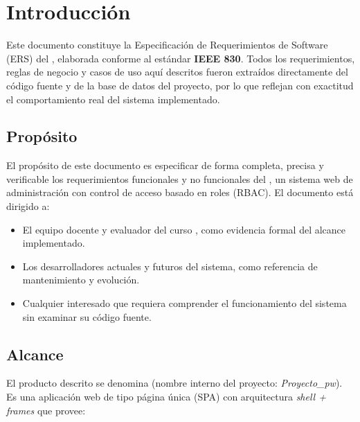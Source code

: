 \chapter{Introducción}

Este documento constituye la Especificación de Requerimientos de Software (ERS)
del \textbf{\nombreSistema}, elaborada conforme al estándar \textbf{IEEE 830}.
Todos los requerimientos, reglas de negocio y casos de uso aquí descritos
fueron extraídos directamente del código fuente y de la base de datos del
proyecto, por lo que reflejan con exactitud el comportamiento real del sistema
implementado.

\section{Propósito}

El propósito de este documento es especificar de forma completa, precisa y
verificable los requerimientos funcionales y no funcionales del
\nombreSistema, un sistema web de administración con control de acceso basado
en roles (RBAC). El documento está dirigido a:

\begin{itemize}
    \item El equipo docente y evaluador del curso \cursoDoc, como evidencia
          formal del alcance implementado.
    \item Los desarrolladores actuales y futuros del sistema, como referencia
          de mantenimiento y evolución.
    \item Cualquier interesado que requiera comprender el funcionamiento del
          sistema sin examinar su código fuente.
\end{itemize}

\section{Alcance}

El producto descrito se denomina \textbf{\nombreSistema} (nombre interno del
proyecto: \textit{Proyecto\_pw}). Es una aplicación web de tipo página única
(SPA) con arquitectura \textit{shell + frames} que provee:

